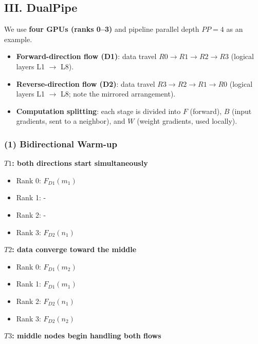 \hypertarget{iii.-dualpipe}{%
\subsection{III. DualPipe}\label{iii.-dualpipe}}

We use \textbf{four GPUs (ranks 0--3)} and pipeline parallel depth \(PP = 4\) as an example.

\begin{itemize}
\tightlist
\item
  \textbf{Forward-direction flow (D1)}: data travel \(R0 \to R1 \to R2 \to R3\) (logical layers L1 \(\to\) L8).
\item
  \textbf{Reverse-direction flow (D2)}: data travel \(R3 \to R2 \to R1 \to R0\) (logical layers L1 \(\to\) L8; note the mirrored arrangement).
\item
  \textbf{Computation splitting}: each stage is divided into \(F\) (forward), \(B\) (input gradients, sent to a neighbor), and \(W\) (weight gradients, used locally).
\end{itemize}

\hypertarget{bidirectional-warm-up}{%
\subsubsection{(1) Bidirectional Warm-up}\label{bidirectional-warm-up}}

\textbf{\(T1\): both directions start simultaneously}

\begin{itemize}
\tightlist
\item
  Rank 0: \(F_{D1}(m_1)\)
\item
  Rank 1: -
\item
  Rank 2: -
\item
  Rank 3: \(F_{D2}(n_1)\)
\end{itemize}

\textbf{\(T2\): data converge toward the middle}

\begin{itemize}
\tightlist
\item
  Rank 0: \(F_{D1}(m_2)\)
\item
  Rank 1: \(F_{D1}(m_1)\)
\item
  Rank 2: \(F_{D2}(n_1)\)
\item
  Rank 3: \(F_{D2}(n_2)\)
\end{itemize}

\textbf{\(T3\): middle nodes begin handling both flows}

